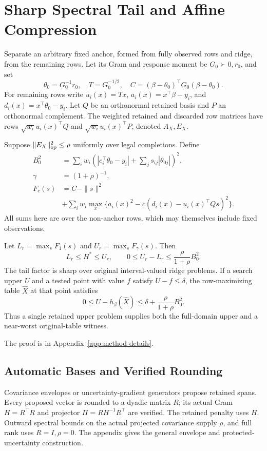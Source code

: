 \section{Sharp Spectral Tail and Affine Compression}\label{app:spectral-v79}
Separate an arbitrary fixed anchor, formed from fully observed rows and ridge, from the remaining rows. Let its Gram and response moment be $G_0\succ0,r_0$, and set
\begin{equation}
 \theta_0=G_0^{-1}r_0,\quad T=G_0^{-1/2},\quad
 C=(\beta-\theta_0)^\top G_0(\beta-\theta_0).
\end{equation}
For remaining rows write $u_i(x)=Tx$, $a_i(x)=x^\top\beta-y_i$, and $d_i(x)=x^\top\theta_0-y_i$. Let $Q$ be an orthonormal retained basis and $P$ an orthonormal complement. The weighted retained and discarded row matrices have rows $\sqrt{w_i}u_i(x)^\top Q$ and $\sqrt{w_i}u_i(x)^\top P$, denoted $A_X,E_X$.

Suppose $\|E_X\|_{\mathrm{op}}^2\leq\rho$ uniformly over legal completions. Define
\begin{align}
 B_0^2&=\sum_iw_i\left(|c_i^\top\theta_0-y_i|
               +\sum_j s_{ij}|\theta_{0j}|\right)^2,\\
 \gamma&=(1+\rho)^{-1},\nonumber\\
 F_c(s)&=C-\|s\|^2\nonumber\\[-2mm]
 &+\sum_iw_i\max_x\{a_i(x)^2-c(d_i(x)-u_i(x)^\top Qs)^2\}.
\end{align}
All sums here are over the non-anchor rows, which may themselves include fixed observations.

\begin{theorem}\label{thm:tail}
Let $L_r=\max_s F_1(s)$ and $U_r=\max_s F_\gamma(s)$. Then
\begin{equation}
 L_r\leq H^*\leq U_r,\qquad
 0\leq U_r-L_r\leq\frac{\rho}{1+\rho}B_0^2.\label{eq:tail}
\end{equation}
The tail factor is sharp over original interval-valued ridge problems. If a search upper $U$ and a tested point with value $f$ satisfy $U-f\leq\delta$, the row-maximizing table $\widehat X$ at that point satisfies
\begin{equation}
 0\leq U-h_\beta(\widehat X)
       \leq\delta+\frac{\rho}{1+\rho}B_0^2.\label{eq:witness}
\end{equation}
Thus a single retained upper problem supplies both the full-domain upper and a near-worst original-table witness.
\end{theorem}
The proof is in Appendix~\ref{app:method-details}.


\subsection{Automatic Bases and Verified Rounding}
Covariance envelopes or uncertainty-gradient generators propose retained spans. Every proposed vector is rounded to a dyadic matrix $R$; its actual Gram $H=R^\top R$ and projector $\Pi=RH^{-1}R^\top$ are verified. The retained penalty uses $H$. Outward spectral bounds on the actual projected covariance supply $\rho$, and full rank uses $R=I,\rho=0$. The appendix gives the general envelope and protected-uncertainty construction.

